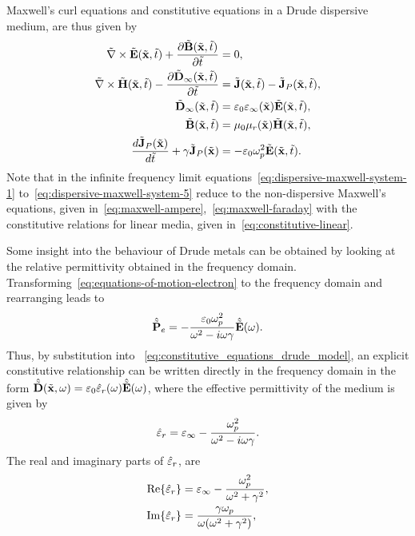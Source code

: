 Maxwell's curl equations and constitutive equations in a Drude dispersive
medium, are thus given by
\begin{subequations}
  \begin{align}
    \tilde{\nabla} \times \tilde{\mathbf{E}}(\tilde{\mathbf{x}},\tilde{t}) + \frac{\partial  \tilde{\mathbf{B}}(\tilde{\mathbf{x}}, \tilde{t})}{\partial \tilde{t} }&= 0, \label{eq:dispersive-maxwell-system-1} \\
    \tilde{\nabla} \times \tilde{\mathbf{H}}(\tilde{\mathbf{x}},\tilde{t}) - \frac{\partial  \tilde{\mathbf{D}}_{\infty}(\tilde{\mathbf{x}}, \tilde{t}) }{\partial \tilde{t} }&= \tilde{\mathbf{J}}(\tilde{\mathbf{x}},\tilde{t}) - \tilde{\mathbf{J}}_P(\tilde{\mathbf{x}},\tilde{t}), \label{eq:dispersive-maxwell-system-2} \\
    \tilde{\mathbf{D}}_{\infty}(\tilde{\mathbf{x}},\tilde{t}) &= \varepsilon_0 \varepsilon_{\infty}(\tilde{\mathbf{x}}) \tilde{\mathbf{E}}(\tilde{\mathbf{x}},\tilde{t}), \label{eq:dispersive-maxwell-system-3} \\
    \tilde{\mathbf{B}}(\tilde{\mathbf{x}},\tilde{t}) &= \mu_0 \mu_r(\tilde{\mathbf{x}}) \tilde{\mathbf{H}}(\tilde{\mathbf{x}},\tilde{t}), \label{eq:dispersive-maxwell-system-4} \\
    \frac{d \tilde{\mathbf{J}}_P(\tilde{\mathbf{x}})}{d \tilde{t}} + \gamma \tilde{\mathbf{J}}_P(\tilde{\mathbf{x}}) &= - \varepsilon_0 \omega_p^2 \tilde{\mathbf{E}}(\tilde{\mathbf{x}}, \tilde{t}) . \label{eq:dispersive-maxwell-system-5}
  \end{align}
  \label{eq:dispersive-maxwell-system}
\end{subequations}
Note that in the infinite frequency limit equations~\eqref{eq:dispersive-maxwell-system-1} to~\eqref{eq:dispersive-maxwell-system-5} reduce to the non-dispersive Maxwell's equations, given in~\eqref{eq:maxwell-ampere},~\eqref{eq:maxwell-faraday} with the constitutive relations for linear media, given in~\eqref{eq:constitutive-linear}.

Some insight into the behaviour of Drude metals can be obtained by looking at
the relative permittivity obtained in the frequency domain.
Transforming~\eqref{eq:equations-of-motion-electron} to the frequency
domain and rearranging leads to
\begin{equation}
  \hat{\tilde{\mathbf{P}}}_e = - \frac{\varepsilon_0 \omega_p^2}{\omega^2 - i \omega \gamma } \hat{\tilde{\mathbf{E}}}(\omega) .
  \label{eq:polarisation-field-freq-domain}
\end{equation}
Thus, by substitution into ~\eqref{eq:constitutive_equations_drude_model}, an explicit constitutive relationship can be written directly in the frequency domain in the form $\hat{\tilde{\mathbf{D}}}(\tilde{\mathbf{x}},\omega) = \varepsilon_0 \hat{\varepsilon}_r (\omega) \hat{\tilde{\mathbf{E}}}(\omega)$, where the effective permittivity of the medium is given by
$$  \hat{\varepsilon}_r = \varepsilon_{\infty} - \frac{\omega_p^2 }{\omega^2 - i \omega \gamma }. $$
The real and imaginary parts of $\hat{\varepsilon}_r$, are
\begin{subequations}
  \begin{align}
    \label{eq:real_imag_parts_of_epsilon}
    \textrm{Re}\{ \hat{\varepsilon}_r \} &= \varepsilon_{\infty} - \frac{\omega_p^2}{\omega^2 + \gamma^2}, \\
    \textrm{Im}\{ \hat{\varepsilon}_r \} &= \frac{\gamma \omega_p}{\omega ( \omega^2 + \gamma^2) } ,
  \end{align}
\end{subequations}

